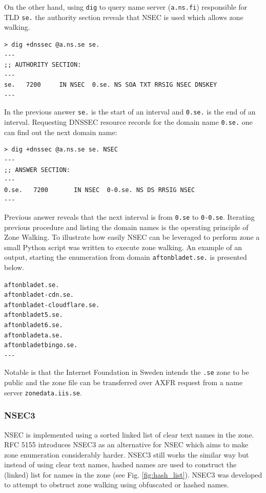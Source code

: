 On the other hand, using \texttt{dig} to query name server (\texttt{a.ns.fi}) responsible for TLD \texttt{se.} the authority section reveals that NSEC is used which allows zone walking.

\begin{verbatim}
> dig +dnssec @a.ns.se se.
---
;; AUTHORITY SECTION:
---
se.   7200	   IN NSEC 	0.se. NS SOA TXT RRSIG NSEC DNSKEY
---
\end{verbatim}

In the previous answer \texttt{se.} is the start of an interval and \texttt{0.se.} is the end of an interval. Requesting DNSSEC resource records for the domain name \texttt{0.se.} one can find out the next domain name:

\begin{verbatim}
> dig +dnssec @a.ns.se se. NSEC
---
;; ANSWER SECTION:
---
0.se.   7200	   IN NSEC 	0-0.se. NS DS RRSIG NSEC
---
\end{verbatim}

Previous answer reveals that the next interval is from \texttt{0.se} to \texttt{0-0.se}. Iterating previous procedure and listing the domain names is the operating principle of Zone Walking. To illustrate how easily NSEC can be leveraged to perform zone a small Python script was written to execute zone walking. An example of an output, starting the enumeration from domain \texttt{aftonbladet.se.} is presented below.

\begin{verbatim}
aftonbladet.se.
aftonbladet-cdn.se.
aftonbladet-cloudflare.se.
aftonbladet5.se.
aftonbladet6.se.
aftonbladeta.se.
aftonbladetbingo.se.
---
\end{verbatim}

Notable is that the Internet Foundation in Sweden \cite{sweden} intends the \texttt{.se} zone to be public and the zone file can be transferred over AXFR request from a name server \texttt{zonedata.iis.se}.

\subsubsection{NSEC3}
\label{sec:nsec3}
NSEC is implemented using a sorted linked list of clear text names in the zone.
RFC 5155 \cite{RFC5155} introduces NSEC3 as an alternative for NSEC which aims to make zone enumeration considerably harder. NSEC3 still works the similar way but instead of using clear text names, hashed names are used to construct the (linked) list for names in the zone (see Fig. \ref{fig:hash_list}). NSEC3 was developed to attempt to obstruct zone walking using obfuscated or hashed names.

